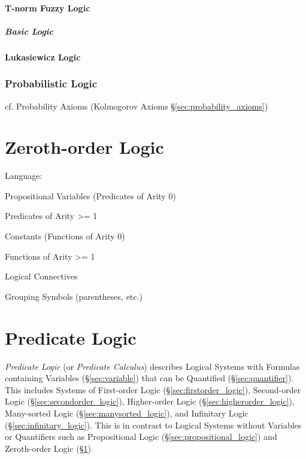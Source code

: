 \paragraph{T-norm Fuzzy Logic}\label{sec:tnorm_logic}\hfill

\subparagraph{Basic Logic}\label{sec:basic_logic}\hfill



\paragraph{Lukasiewicz Logic}\label{sec:lukasiewicz_logic}\hfill



\subsubsection{Probabilistic Logic}\label{sec:probabilistic_logic}

cf. Probability Axioms (Kolmogorov Axioms \S\ref{sec:probability_axioms})



\section{Zeroth-order Logic}\label{sec:zerothorder_logic}


Language:

Propositional Variables (Predicates of Arity 0)

Predicates of Arity >= 1

Constants (Functions of Arity 0)

Functions of Arity >= 1

Logical Connectives

Grouping Symbols (parentheses, etc.)



\section{Predicate Logic}\label{sec:predicate_logic}

\emph{Predicate Logic} (or \emph{Predicate Calculus}) describes
Logical Systems with Formulas containing Variables
(\S\ref{sec:variable}) that can be Quantified
(\S\ref{sec:quantifier}). This includes Systems of First-order Logic
(\S\ref{sec:firstorder_logic}), Second-order Logic
(\S\ref{sec:secondorder_logic}), Higher-order Logic
(\S\ref{sec:higherorder_logic}), Many-sorted Logic
(\S\ref{sec:manysorted_logic}), and Infinitary Logic
(\S\ref{sec:infinitary_logic}). This is in contrast to Logical Systems
without Variables or Quantifiers such as Propositional Logic
(\S\ref{sec:propositional_logic}) and Zeroth-order Logic
(\S\ref{sec:zerothorder_logic}).


